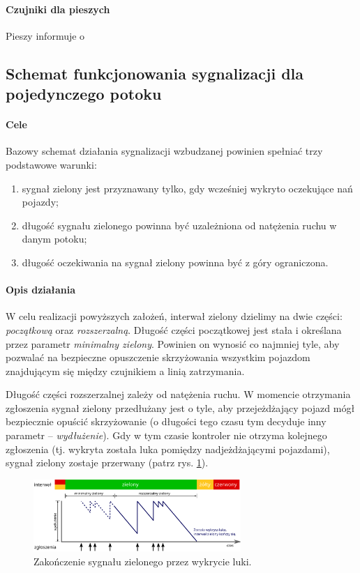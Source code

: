 \documentclass{pracamgr}
\begin{document}
\paragraph{Czujniki dla pieszych} Pieszy informuje o 

\subsection{Schemat funkcjonowania sygnalizacji dla pojedynczego potoku}
\label{ss:schemat}

\paragraph{Cele} Bazowy schemat działania
sygnalizacji wzbudzanej powinien spełniać trzy podstawowe warunki:
\begin{enumerate}
  \item sygnał zielony jest przyznawany tylko, gdy wcześniej wykryto
  oczekujące nań pojazdy;
  \item długość sygnału zielonego powinna być uzależniona od natężenia
  ruchu w danym potoku;
  \item długość oczekiwania na sygnał zielony powinna być z góry ograniczona.
\end{enumerate}

\paragraph{Opis działania} W celu realizacji powyższych założeń, interwał
zielony dzielimy na dwie części: \emph{początkową} oraz
\emph{rozszerzalną}. Długość części początkowej jest stała i określana
przez parametr \emph{minimalny zielony}. Powinien on wynosić co
najmniej tyle, aby pozwalać na bezpieczne opuszczenie skrzyżowania
wszystkim pojazdom znajdującym się między czujnikiem a linią
zatrzymania.

Długość części rozszerzalnej zależy od natężenia ruchu. W
momencie otrzymania zgłoszenia sygnał zielony przedłużany jest o tyle,
aby przejeżdżający pojazd mógł bezpiecznie opuścić skrzyżowanie (o
długości tego czasu tym decyduje inny parametr -- \emph{wydłużenie}). Gdy w tym
czasie kontroler nie otrzyma kolejnego zgłoszenia (tj. wykryta została
luka pomiędzy nadjeżdżającymi pojazdami), sygnał zielony zostaje
przerwany (patrz rys. \ref{img:gap-out}).

\begin{figure}[ht]
  \centering
  \includegraphics[width=0.7\textwidth]{img/signals-gap-out}
  \caption{Zakończenie sygnału zielonego przez wykrycie luki.}
\label{img:gap-out}
\end{figure}
\end{document}
